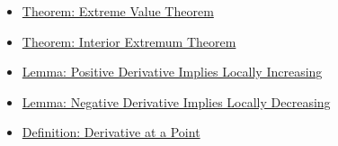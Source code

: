 \begin{dependencies}
\begin{itemize}
  \item \hyperref[thm:extreme-value-theorem]{Theorem: Extreme Value Theorem}
  \item \hyperref[thm:interior-extremum-theorem]{Theorem: Interior Extremum Theorem}
  \item \hyperref[lem:positive-derivative-implies-locally-increasing]{Lemma: Positive Derivative Implies Locally Increasing}
  \item \hyperref[lem:negative-derivative-implies-locally-decreasing]{Lemma: Negative Derivative Implies Locally Decreasing}
  \item \hyperref[def:derivative-at-a-point]{Definition: Derivative at a Point}
\end{itemize}
\end{dependencies}

\clearpage
